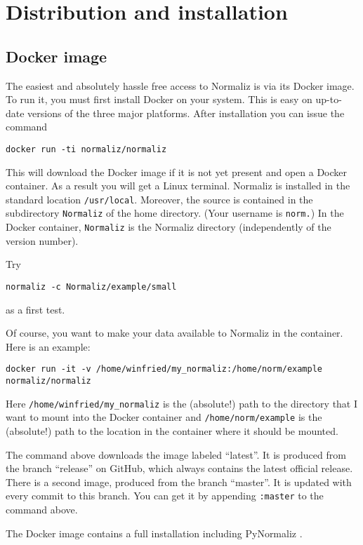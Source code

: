\documentclass[12pt,a4paper]{scrartcl}
\theoremstyle{definition}
\begin{document}
\section{Distribution and installation}\label{Distr}

\subsection{Docker image}
The easiest and absolutely hassle free access to Normaliz is via its Docker image. To run it, you must first install Docker on your system. This is easy on up-to-date versions of the three major platforms. After installation you can issue the command 
\begin{Verbatim}
docker run -ti normaliz/normaliz
\end{Verbatim}
This will download the Docker image if it is not yet present and open a Docker container. As a result you will get a Linux terminal. Normaliz is installed in the standard location \verb|/usr/local|. Moreover, the source is contained in the subdirectory \verb|Normaliz| of the home directory. (Your username is \verb|norm.|) In the Docker container, \verb|Normaliz| is the Normaliz directory (independently of the version number).

Try
\begin{Verbatim}
normaliz -c Normaliz/example/small
\end{Verbatim}
as a first test.

Of course, you want to make your data available to Normaliz in the container. Here is an example:
\begin{Verbatim}
docker run -it -v /home/winfried/my_normaliz:/home/norm/example  normaliz/normaliz
\end{Verbatim} 
Here \verb|/home/winfried/my_normaliz| is the (absolute!) path to the directory that I want to mount into the Docker container and \verb|/home/norm/example| is the (absolute!) path to the location in the container where it should be mounted.

The command above downloads the image labeled ``latest''. It is produced from the branch ``release'' on GitHub, which always contains the latest official release. There is a second image, produced from the branch ``master''. It is updated with every commit to this branch. You can get it by appending \verb|:master| to the command above.

The Docker image contains a full installation including PyNormaliz .
\end{document}
